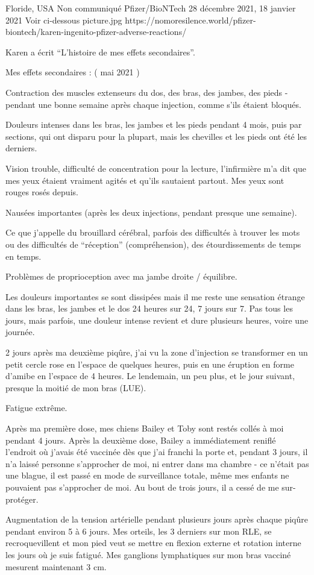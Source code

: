 {Floride, USA}
{Non communiqué}
{Pfizer/BioNTech}
{28 décembre  2021, 18 janvier 2021}
{Voir ci-dessous}
{picture.jpg}
{https://nomoresilence.world/pfizer-biontech/karen-ingenito-pfizer-adverse-reactions/}
{

Karen a écrit “L'histoire de mes effets secondaires”.

Mes effets secondaires : ( mai 2021 )

Contraction des muscles extenseurs du dos, des bras, des jambes, des pieds -
pendant une bonne semaine après chaque injection, comme s'ils étaient bloqués.

Douleurs intenses dans les bras, les jambes et les pieds pendant 4 mois, puis
par sections, qui ont disparu pour la plupart, mais les chevilles et les pieds
ont été les derniers.

Vision trouble, difficulté de concentration pour la lecture, l'infirmière m'a
dit que mes yeux étaient vraiment agités et qu'ils sautaient partout. Mes yeux
sont rouges rosés depuis.

Nausées importantes (après les deux injections, pendant presque une semaine).

Ce que j'appelle du brouillard cérébral, parfois des difficultés à trouver les
mots ou des difficultés de “réception” (compréhension), des étourdissements de
temps en temps.

Problèmes de proprioception avec ma jambe droite / équilibre.

Les douleurs importantes se sont dissipées mais il me reste une sensation
étrange dans les bras, les jambes et le dos 24 heures sur 24, 7 jours sur 7. Pas
tous les jours, mais parfois, une douleur intense revient et dure plusieurs
heures, voire une journée.

2 jours après ma deuxième piqûre, j'ai vu la zone d'injection se transformer en
un petit cercle rose en l'espace de quelques heures, puis en une éruption en
forme d'amibe en l'espace de 4 heures. Le lendemain, un peu plus, et le jour
suivant, presque la moitié de mon bras (LUE).

Fatigue extrême.

Après ma première dose, mes chiens Bailey et Toby sont restés collés à moi
pendant 4 jours. Après la deuxième dose, Bailey a immédiatement reniflé
l'endroit où j'avais été vaccinée dès que j'ai franchi la porte et, pendant 3
jours, il n'a laissé personne s'approcher de moi, ni entrer dans ma chambre - ce
n'était pas une blague, il est passé en mode de surveillance totale, même mes
enfants ne pouvaient pas s'approcher de moi. Au bout de trois jours, il a cessé
de me sur-protéger.

Augmentation de la tension artérielle pendant plusieurs jours après chaque
piqûre pendant environ 5 à 6 jours. Mes orteils, les 3 derniers sur mon RLE, se
recroquevillent et mon pied veut se mettre en flexion externe et rotation
interne les jours où je suis fatigué. Mes ganglions lymphatiques sur mon bras
vacciné mesurent maintenant 3 cm.

}
